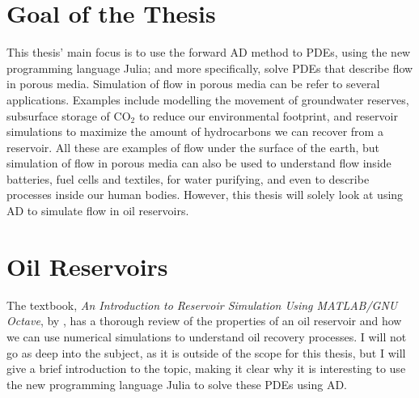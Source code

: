 \section{Goal of the Thesis}
This thesis' main focus is to use the forward AD method to PDEs, using the new programming language Julia; and more specifically, solve PDEs that describe flow in porous media. Simulation of flow in porous media can be refer to several applications. Examples include modelling the movement of groundwater reserves, subsurface storage of CO$_2$ to reduce our environmental footprint, and reservoir simulations to maximize the amount of hydrocarbons we can recover from a reservoir. All these are examples of flow under the surface of the earth, but simulation of flow in porous media can also be used to understand flow inside batteries, fuel cells and textiles, for water purifying, and even to describe processes inside our human bodies. However, this thesis will solely look at using AD to simulate flow in oil reservoirs.

\section{Oil Reservoirs}
\label{sec:OilReservoirs}
The textbook, \textit{An Introduction to Reservoir Simulation Using MATLAB/GNU Octave}, by \emph{\citet{lieMrstUrl}}, has a thorough review of the properties of an oil reservoir and how we can use numerical simulations to understand oil recovery processes. I will not go as deep into the subject, as it is outside of the scope for this thesis, but I will give a brief introduction to the topic, making it clear why it is interesting to use the new programming language Julia to solve these PDEs using AD.

